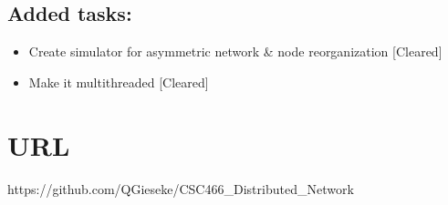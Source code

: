 \documentclass{article}
\begin{document}
\subsection{Added tasks:}
\begin{itemize}
	\item Create simulator for asymmetric network \& node reorganization [Cleared]
	\item Make it multithreaded [Cleared]
\end{itemize}

\section{URL}
https://github.com/QGieseke/CSC466\_Distributed\_Network
\end{document}
